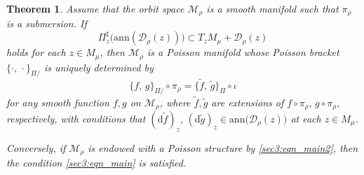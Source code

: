 \documentclass[a4paper,11pt,dvipdfmx]{article}
\newtheorem{thm}{Theorem}[section]
\numberwithin{equation}{section}
\begin{document}
\begin{thm}\label{sec3:main thm}
Assume that the orbit space $\mathcal{M}_{\rho}$ is a smooth manifold such that $\pi_{\rho}$ is a submersion. 
If 
\begin{equation}\label{sec3:eqn_main}
\Pi^{\sharp}_z\bigl(\mathrm{ann}(\mathcal{D}_{\rho}(z))\bigr) \subset T_zM_{\mu} + \mathcal{D}_{\rho}(z)
\end{equation}
holds for each $z\in M_{\mu}$, then 
$\mathcal{M}_{\rho}$ is a Poisson manifold whose Poisson bracket $\{\cdot,\,\cdot\}_{\Pi/}$ is uniquely determined by 
\begin{equation}\label{sec3:eqn_main2}
 \{f,\,g\}_{\Pi/}\circ\pi_{\rho} = \{\tilde{f},\,\tilde{g}\}_{\Pi}\circ\iota 
\end{equation}
for any smooth function $f,g$ on $\mathcal{M}_{\rho}$, where $\tilde{f},\tilde{g}$ are extensions of $f\circ\pi_{\rho},\,g\circ\pi_{\rho}$, respectively, with conditions that 
$(\mathrm{d}\tilde{f})_z,\,(\mathrm{d}\tilde{g})_z\in \mathrm{ann}\bigl(\mathcal{D}_{\rho}(z)\bigr)$ at each $z\in M_{\mu}$. 

Conversely, if $\mathcal{M}_{\rho}$ is endowed with a Poisson structure by \eqref{sec3:eqn_main2}, then the condition \eqref{sec3:eqn_main} is satisfied. 
\end{thm}
\end{document}
